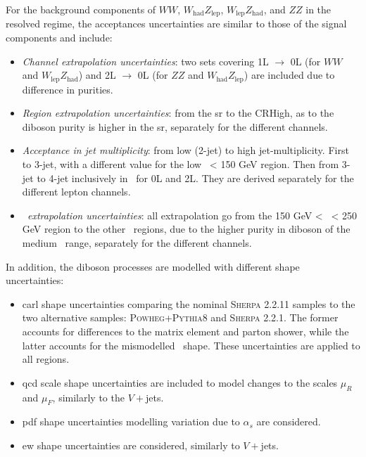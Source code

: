 \newpage
For the background components of $WW$, $W_{\text{had}}Z_{\text{lep}}$, $W_{\text{lep}}Z_{\text{had}}$, and $ZZ$ in the resolved regime, the acceptances uncertainties are similar to those of the signal components and include:
\begin{itemize}[leftmargin=*]
    \item \textit{Channel extrapolation uncertainties}: two sets covering 1L $\rightarrow$ 0L (for $WW$ and $W_{\text{lep}}Z_{\text{had}}$) and 2L $\rightarrow$ 0L (for $ZZ$ and $W_{\text{had}}Z_{\text{lep}}$) are included due to difference in purities.
    \item \textit{Region extrapolation uncertainties}: from the \gls{sr} to the CRHigh, as to the diboson purity is higher in the \gls{sr}, separately for the different channels.
    \item \textit{Acceptance in jet multiplicity}: from low (2-jet) to high jet-multiplicity. First to 3-jet, with a different value for the low \ptv\ < 150 GeV region. Then from 3-jet to 4-jet inclusively in \ptv\ for 0L and 2L. They are derived separately for the different lepton channels. 
    \item \textit{\ptv\ extrapolation uncertainties}: all extrapolation go from the 150 GeV < \ptv\ < 250 GeV region to the other \ptv\ regions, due to the higher purity in diboson of the medium \ptv\ range, separately for the different channels.
\end{itemize}

In addition, the diboson processes are modelled with different shape uncertainties:
\begin{itemize}[leftmargin=*]
    \item \gls{carl} shape uncertainties comparing the nominal \textsc{Sherpa} 2.2.11 samples to the two alternative samples: \textsc{Powheg}+\textsc{Pythia}8 and \textsc{Sherpa} 2.2.1. The former accounts for differences to the matrix element and parton shower, while the latter accounts for the mismodelled \ptv\ shape. These uncertainties are applied to all regions.
    \item \gls{qcd} scale shape uncertainties are included to model changes to the scales $\mu_R$ and $\mu_F$, similarly to the $V+$jets.
    \item \gls{pdf} shape uncertainties modelling variation due to $\alpha_s$ are considered.
    \item \gls{ew} shape uncertainties are considered, similarly to $V+$jets.
\end{itemize}

